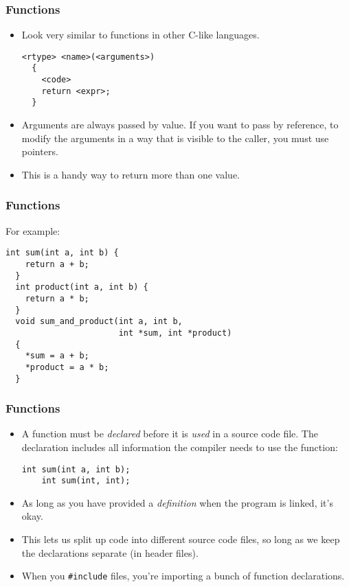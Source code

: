 \begin{frame}[fragile]
  \frametitle{Functions}
  \begin{itemize}
  \item Look very similar to functions in other C-like languages.
\begin{lstlisting}[style=c]
  <rtype> <name>(<arguments>)
  {
    <code>
    return <expr>;
  }
\end{lstlisting}
  \item Arguments are always passed by value. If you want to pass by reference,
    to modify the arguments in a way that is visible to the caller, you must use
    pointers.
  \item This is a handy way to return more than one value.
  \end{itemize}
\end{frame}

\begin{frame}[fragile]
  \frametitle{Functions}
  For example:
\begin{lstlisting}[style=c]
  int sum(int a, int b) {
    return a + b;
  }
  int product(int a, int b) {
    return a * b;
  }
  void sum_and_product(int a, int b,
                       int *sum, int *product)
  {
    *sum = a + b;
    *product = a * b;
  }
\end{lstlisting}
\end{frame}

\begin{frame}[fragile]
  \frametitle{Functions}
  \begin{itemize}
  \item A function must be \emph{declared} before it is \emph{used} in a source
    code file. The declaration includes all information the compiler needs to
    use the function:
\begin{lstlisting}[style=c]
    int sum(int a, int b);
    int sum(int, int);
\end{lstlisting}
  \item As long as you have provided a \emph{definition} when the program is
    linked, it's okay.
  \item This lets us split up code into different source code files, so long as
    we keep the declarations separate (in header files).
  \item When you \texttt{\#include} files, you're importing a bunch of function
    declarations.
  \end{itemize}
\end{frame}

